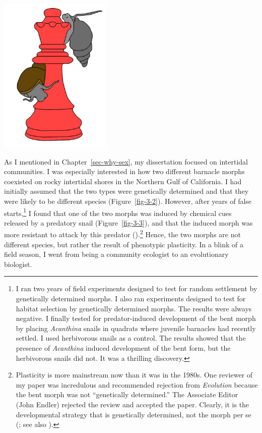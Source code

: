 \documentclass[
  letterpaper,
]{book}
\begin{document}
\begin{center}
\includegraphics[width=0.4\textwidth,height=\textheight]{images/fig3-1.jpeg}
\end{center}

As I mentioned in Chapter~\ref{sec-why-sex}, my dissertation focused on
intertidal communities. I was especially interested in how two different
barnacle morphs coexisted on rocky intertidal shores in the Northern
Gulf of California. I had initially assumed that the two types were
genetically determined and that they were likely to be different species
(Figure~\ref{fig-3-2}). However, after years of false starts,\footnote{I
  ran two years of field experiments designed to test for random
  settlement by genetically determined morphs. I also ran experiments
  designed to test for habitat selection by genetically determined
  morphs. The results were always negative. I finally tested for
  predator-induced development of the bent morph by placing
  \emph{Acanthina} snails in quadrats where juvenile barnacles had
  recently settled. I used herbivorous snails as a control. The results
  showed that the presence of \emph{Acanthina} induced development of
  the bent form, but the herbivorous snails did not. It was a thrilling
  discovery.} I found that one of the two morphs was induced by chemical
cues released by a predatory snail (Figure~\ref{fig-3-3}), and that the
induced morph was more resistant to attack by this predator
().\footnote{Plasticity is more
  mainstream now than it was in the 1980s. One reviewer of my paper was
  incredulous and recommended rejection from \emph{Evolution} because
  the bent morph was not ``genetically determined.'' The Associate
  Editor (John Endler) rejected the review and accepted the paper.
  Clearly, it is the developmental strategy that is genetically
  determined, not the morph per se (; see also ).} Hence, the two morphs are not different
species, but rather the result of phenotypic plasticity. In a blink of a
field season, I went from being a community ecologist to an evolutionary
biologist.
\end{document}
